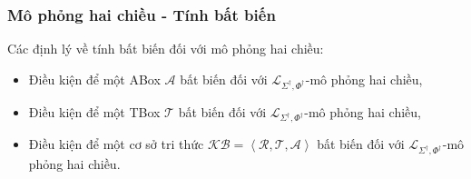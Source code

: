 \documentclass[fleqn]{beamer}
\newcommand{\mL}		{\mathcal{L}}
\newcommand{\mA}		{\mathcal{A}}
\newcommand{\mT}		{\mathcal{T}}
\newcommand{\mR}		{\mathcal{R}}
\newcommand{\KB}		{\mathcal{KB}}
\newcommand{\mLSPD}		{\mL_{\Sigma^\dag,\Phi^\dag}}
\newcommand{\tuple}[1]	{\left\langle#1\right\rangle\!}
\begin{document}
\begin{frame}\frametitle{\bf Mô phỏng hai chiều - Tính bất biến}
	Các định lý về tính bất biến đối với mô phỏng hai chiều:
	\vspace{2.0ex}
	
	\begin{itemize}
		\item Điều kiện để một ABox $\mA$ bất biến đối với $\mLSPD$-mô phỏng hai chiều,
		\vspace{2.0ex}
		
		\item Điều kiện để một TBox $\mT$ bất biến đối với $\mLSPD$-mô phỏng hai chiều,
		\vspace{2.0ex}
		
		\item Điều kiện để một cơ sở tri thức $\KB = \tuple{\mR, \mT, \mA}$ bất biến đối với $\mLSPD$-mô phỏng hai chiều.      
	\end{itemize}
\end{frame}
\end{document}
